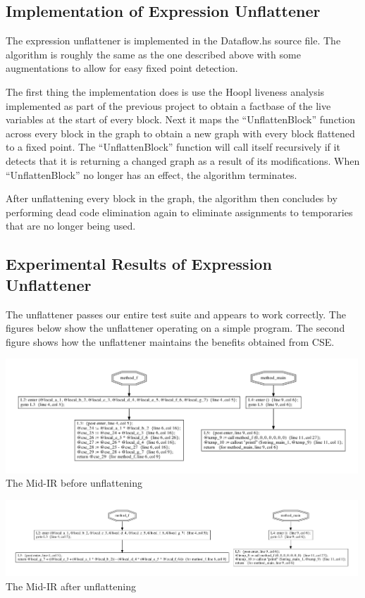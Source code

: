 \documentclass[11pt]{article}
\begin{document}
\subsection{Implementation of Expression Unflattener}

The expression unflattener is implemented in the Dataflow.hs source
file. The algorithm is roughly the same as the one described above
with some augmentations to allow for easy fixed point detection.

The first thing the implementation does is use the Hoopl liveness
analysis implemented as part of the previous project to obtain a
factbase of the live variables at the start of every block. Next it
maps the ``UnflattenBlock'' function across every block in the graph
to obtain a new graph with every block flattened to a fixed point. The
``UnflattenBlock'' function will call itself recursively if it detects
that it is returning a changed graph as a result of its
modifications. When ``UnflattenBlock'' no longer has an effect, the
algorithm terminates.

After unflattening every block in the graph, the algorithm then
concludes by performing dead code elimination again to eliminate
assignments to temporaries that are no longer being used.

\subsection{Experimental Results of Expression Unflattener}

The unflattener passes our entire test suite and appears to work
correctly. The figures below show the unflattener operating on a
simple program. The second figure shows how the unflattener maintains
the benefits obtained from CSE. 

\begin{center}
\includegraphics[width=500px]{graphs/unflatten_before}\\
The Mid-IR before unflattening 
\end{center}

\begin{center}
\includegraphics[width=500px]{graphs/unflatten_after}\\
The Mid-IR after unflattening
\end{center}
\end{document}
